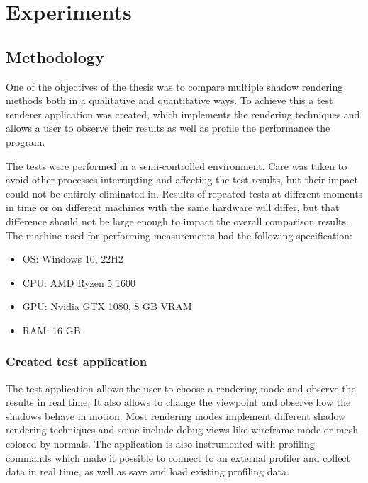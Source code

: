 \chapter{Experiments}

\section{Methodology}
One of the objectives of the thesis was to compare multiple shadow rendering methods both in a qualitative and quantitative ways. To achieve this a test renderer application was created, which implements the rendering techniques and allows a user to observe their results as well as profile the performance the program.

The tests were performed in a semi-controlled environment. Care was taken to avoid other processes interrupting and affecting the test results, but their impact could not be entirely eliminated in. Results of repeated tests at different moments in time or on different machines with the same hardware will differ, but that difference should not be large enough to impact the overall comparison results. 
The machine used for performing measurements had the following specification:
\begin{itemize}
    \item OS: Windows 10, 22H2
    \item CPU: AMD Ryzen 5 1600
    \item GPU: Nvidia GTX 1080, 8 GB VRAM
    \item RAM: 16 GB
\end{itemize}

\subsection{Created test application}
The test application allows the user to choose a rendering mode and observe the results in real time. It also allows to change the viewpoint and observe how the shadows behave in motion. Most rendering modes implement different shadow rendering techniques and some include debug views like wireframe mode or mesh colored by normals. The application is also instrumented with profiling commands which make it possible to connect to an external profiler and collect data in real time, as well as save and load existing profiling data.

